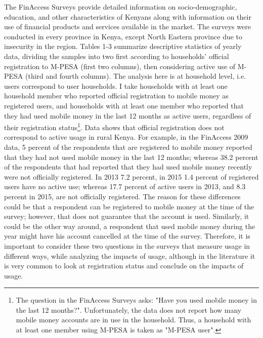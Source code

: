 \documentclass[11pt]{article}
\numberwithin{equation}{section}
\begin{document}
The FinAccess Surveys provide detailed information on socio-demographic, education, and other characteristics of Kenyans along with information on their use of financial products and services available in the market. The surveys were conducted in every province in Kenya, except North Eastern province due to insecurity in the region. Tables 1-3 summarize descriptive statistics of yearly data, dividing the samples into two first according to households' official registration to M-PESA (first two columns), then considering active use of M-PESA (third and fourth columns). The analysis here is at household level, i.e. users correspond to user households. 
I take households with at least one household member who reported official registration to mobile money as registered users, and households with at least one member who reported that they had used mobile money in the last 12 months as active users, regardless of their registration status\footnote{The question in the FinAccess Surveys asks: "Have you used mobile money in the last 12 months?". Unfortunately, the data does not report how many mobile money accounts are in use in the household. Thus, a household with at least one member using M-PESA is taken as "M-PESA user".}. Data shows that official registration does not correspond to active usage in rural Kenya. For example, in the FinAccess 2009 data, 5 percent of the respondents that are registered to mobile money reported that they had not used mobile money in the last 12 months; whereas 38.2 percent of the respondents that had reported that they had used mobile money recently were not officially registered. In 2013 7.2 percent, in 2015 1.4 percent of registered users have no active use; whereas 17.7 percent of active users in 2013, and 8.3 percent in 2015, are not officially registered. The reason for these differences could be that a respondent can be registered to mobile money at the time of the survey; however, that does not guarantee that the account is used.  Similarly, it could be the other way around, a respondent that used mobile money during the year might have his account cancelled at the time of the survey. Therefore, it is important to consider these two questions in the surveys that measure usage in different ways, while analyzing the impacts of usage, although in the literature it is very common to look at registration status and conclude on the impacts of usage. 
\end{document}
